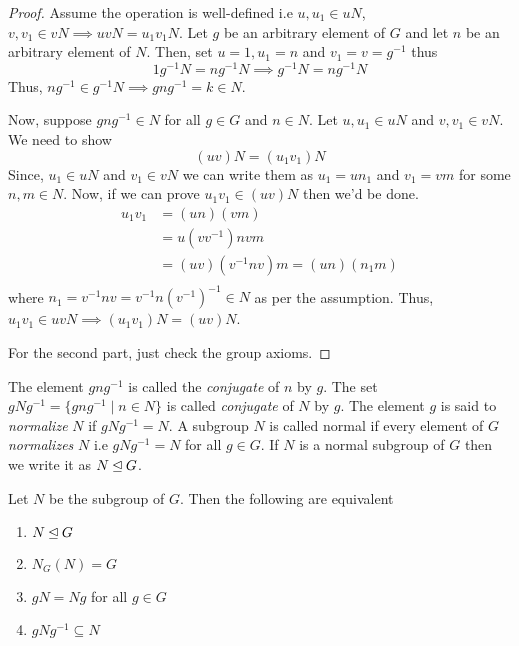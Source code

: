 \begin{proof}
    Assume the operation is well-defined i.e $u,u_1 \in uN$, $v,v_1 \in vN \implies uv N = u_1v_1 N$.
    Let $g$ be an arbitrary element of $G$ and let $n$ be an arbitrary element of $N$. Then, set $u=1,u_1=n$ and $v_1=v=g^{-1}$ thus
    \[ 1 g^{-1}N =  n g^{-1} N \implies g^{-1} N = ng^{-1} N   \]
    Thus, $ng^{-1} \in g^{-1}N \implies gng^{-1} = k \in N$.
    
    Now, suppose $gng^{-1} \in N$ for all $g \in G$ and $n \in N$. Let $u,u_1 \in uN$ and $v,v_1 \in vN$. We need to show
    \[ (uv)N=(u_1 v_1)N \]
    Since, $u_1 \in uN$ and $v_1 \in vN$ we can write them as $u_1 = un_1$ and $v_1 = vm$ for some $n,m \in N$.
    Now, if we can prove $u_1 v_1 \in (uv)N$ then we'd be done.
    \begin{align*}
        u_1 v_1 &= (un)(vm) \\
        &= u(vv^{-1})nvm \\
        &= (uv)(v^{-1}nv)m = (un)(n_1m) \\
    \end{align*}
    where $n_1 = v^{-1}nv = v^{-1}n(v^{-1})^{-1} \in N$ as per the assumption. Thus, $u_1 v_1 \in uv N \implies (u_1v_1)N = (uv)N$.

    For the second part, just check the group axioms.
\end{proof}

\begin{definition}
    The element $gng^{-1}$ is called the \textit{conjugate} of $n$ by $g$. The set $gNg^{-1} = \{gng^{-1} \mid n \in N\}$ is called 
    \textit{conjugate} of $N$ by $g$. The element $g$ is said to \textit{normalize} $N$ if $gNg^{-1}=N$. A subgroup $N$ is called 
    normal if every element of $G$ \textit{normalizes} $N$ i.e $gNg^{-1}=N$ for all $g \in G$. If $N$ is a normal subgroup of $G$ then 
    we write it as $N \unlhd G$.
\end{definition}

\begin{proposition}
    Let $N$ be the subgroup of $G$. Then the following are equivalent 
    \begin{enumerate}
        \item $N \unlhd G$
        \item $N_G(N)=G$
        \item $gN=Ng$ for all $g \in G$
        \item $gNg^{-1} \subseteq N$
    \end{enumerate}
\end{proposition}

